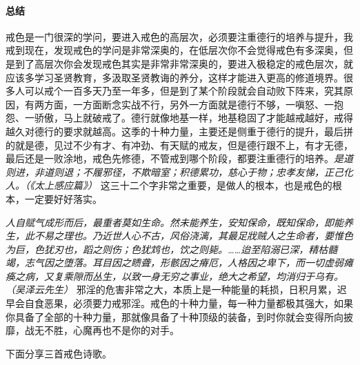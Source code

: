 \paragraph*{总结}

戒色是一门很深的学问，要进入戒色的高层次，必须要注重德行的培养与提升，我戒到现在，发现戒色的学问是非常深奥的，在低层次你不会觉得戒色有多深奥，但是到了高层次你会发现戒色其实是非常非常深奥的，要进入极稳定的戒色层次，就应该多学习圣贤教育，多汲取圣贤教诲的养分，这样才能进入更高的修道境界。很多人可以戒个一百多天乃至一年多，但是到了某个阶段就会自动败下阵来，究其原因，有两方面，一方面断念实战不行，另外一方面就是德行不够，一嗔怒、一抱怨、一骄傲，马上就破戒了。德行就像地基一样，地基稳固了才能越戒越好，戒得越久对德行的要求就越高。这季的十种力量，主要还是侧重于德行的提升，最后拼的就是德，见过不少有才、有冲劲、有天赋的戒友，但是德行跟不上，有才无德，最后还是一败涂地，戒色先修德，不管戒到哪个阶段，都要注重德行的培养。\textit{是道则进，非道则退；不履邪径，不欺暗室；积德累功，慈心于物；忠孝友悌，正己化人。（《太上感应篇》）} 这三十二个字非常之重要，是做人的根本，也是戒色的根本，一定要好好落实。

\textit{人自赋气成形而后，最重者莫如生命。然未能养生，安知保命，既知保命，即能养生，此不易之理也。乃近世人心不古，风俗浇漓，其最足戕贼人之生命者，要惟色为巨，色犹刃也，蹈之则伤；色犹鸩也，饮之则毙。……迨至陷溺已深，精枯髓竭，志气因之堕落。耳目因之瞆聋，形骸因之瘠厄，人格因之卑下，而一切虚弱瘫痪之病，又复乘隙而丛生，以致一身无穷之事业，绝大之希望，均消归于乌有。（吴泽云先生）} 邪淫的危害非常之大，本质上是一种能量的耗损，日积月累，迟早会自食恶果，必须要力戒邪淫。戒色的十种力量，每一种力量都极其强大，如果你具备了全部的十种力量，那就像具备了十种顶级的装备，到时你就会变得所向披靡，战无不胜，心魔再也不是你的对手。

下面分享三首戒色诗歌。

